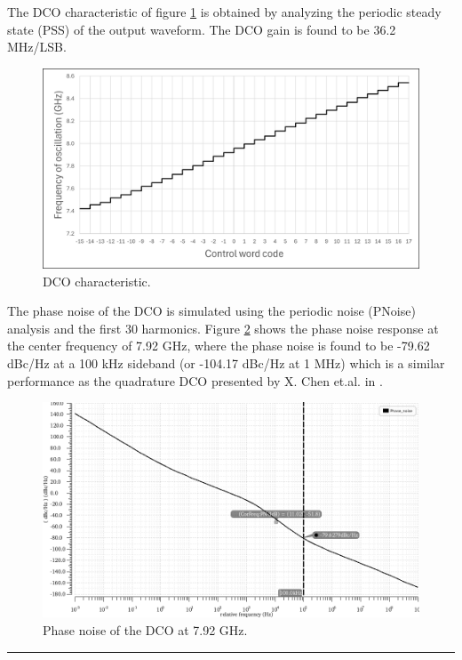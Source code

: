The DCO characteristic of figure \ref{fig:DCO_characteristic} is obtained by analyzing the periodic steady state (PSS) of the output waveform. The DCO gain is found to be 36.2 MHz/LSB.

\begin{figure}[H]
    \centering
    \includegraphics[width=1\textwidth]{figures/DCO_characteristic.png}
    \caption{DCO characteristic.}
    \label{fig:DCO_characteristic}
\end{figure}

The phase noise of the DCO is simulated using the periodic noise (PNoise) analysis and the first 30 harmonics. Figure \ref{fig:DCO_phase_noise} shows the
phase noise response at the center frequency of 7.92 GHz, where the phase noise is found to be -79.62 dBc/Hz at a 100 kHz sideband (or -104.17 dBc/Hz at 1 MHz) which is
a similar performance as the quadrature DCO presented by X. Chen et.al. in \cite{DCO_Chen2023}.

\begin{figure}[H]
    \centering
    \includegraphics[width=1\textwidth]{figures/DCO_phase_noise.png}
    \caption{Phase noise of the DCO at 7.92 GHz.}
    \label{fig:DCO_phase_noise}
\end{figure}

\noindent\rule{\textwidth}{1pt}